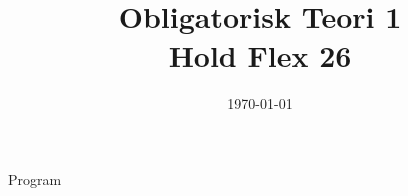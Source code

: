 \documentclass[11pt,aspectratio=169]{beamer}
\title{Obligatorisk Teori 1 \\
Hold Flex 26}
\date{\today}
\begin{document}
\begin{frame}
  \titlepage
\end{frame}

\begin{frame}{Program}
  \tableofcontents
\end{frame}












\end{document}
